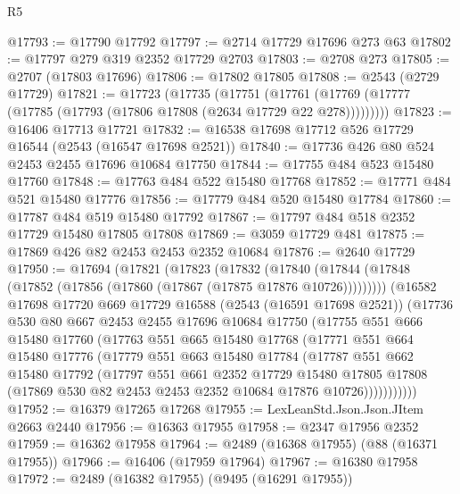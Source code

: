 \begin{lexlean}{R5}
\begin{coremodule}
@17793 := @17790 @17792
@17797 := @2714 @17729 @17696 @273 @63
@17802 := @17797 @279 @319 @2352 @17729 @2703
@17803 := @2708 @273
@17805 := @2707 (@17803 @17696)
@17806 := @17802 @17805
@17808 := @2543 (@2729 @17729)
@17821 := @17723
    (@17735
      (@17751 (@17761 (@17769 (@17777 (@17785 (@17793 (@17806 @17808 (@2634 @17729 @22 @278)))))))))
@17823 := @16406 @17713 @17721
@17832 := @16538 @17698 @17712 @526 @17729 @16544 (@2543 (@16547 @17698 @2521))
@17840 := @17736 @426 @80 @524 @2453 @2455 @17696 @10684 @17750
@17844 := @17755 @484 @523 @15480 @17760
@17848 := @17763 @484 @522 @15480 @17768
@17852 := @17771 @484 @521 @15480 @17776
@17856 := @17779 @484 @520 @15480 @17784
@17860 := @17787 @484 @519 @15480 @17792
@17867 := @17797 @484 @518 @2352 @17729 @15480 @17805 @17808
@17869 := @3059 @17729 @481
@17875 := @17869 @426 @82 @2453 @2453 @2352 @10684
@17876 := @2640 @17729
@17950 := @17694
    (@17821
      (@17823
        (@17832
          (@17840 (@17844 (@17848 (@17852 (@17856 (@17860 (@17867 (@17875 @17876 @10726)))))))))
        (@16582
          @17698
          @17720
          @669
          @17729
          @16588
          (@2543 (@16591 @17698 @2521))
          (@17736
            @530
            @80
            @667
            @2453
            @2455
            @17696
            @10684
            @17750
            (@17755
              @551
              @666
              @15480
              @17760
              (@17763
                @551
                @665
                @15480
                @17768
                (@17771
                  @551
                  @664
                  @15480
                  @17776
                  (@17779
                    @551
                    @663
                    @15480
                    @17784
                    (@17787
                      @551
                      @662
                      @15480
                      @17792
                      (@17797
                        @551
                        @661
                        @2352
                        @17729
                        @15480
                        @17805
                        @17808
                        (@17869 @530 @82 @2453 @2453 @2352 @10684 @17876 @10726)))))))))))
@17952 := @16379 @17265 @17268
@17955 := LexLeanStd.Json.Json.JItem @2663 @2440
@17956 := @16363 @17955
@17958 := @2347 @17956 @2352
@17959 := @16362 @17958
@17964 := @2489 (@16368 @17955) (@88 (@16371 @17955))
@17966 := @16406 (@17959 @17964)
@17967 := @16380 @17958
@17972 := @2489 (@16382 @17955) (@9495 (@16291 @17955))

\end{coremodule}
\end{lexlean}
